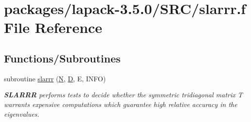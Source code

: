 \hypertarget{slarrr_8f}{}\section{packages/lapack-\/3.5.0/\+S\+R\+C/slarrr.f File Reference}
\label{slarrr_8f}
\subsection*{Functions/\+Subroutines}
\begin{DoxyCompactItemize}
\item 
subroutine \hyperlink{group__auxOTHERauxiliary_ga37c1c1075019c75d8975e952a09516d5}{slarrr} (\hyperlink{polmisc_8c_a0240ac851181b84ac374872dc5434ee4}{N}, \hyperlink{odrpack_8h_a7dae6ea403d00f3687f24a874e67d139}{D}, E, I\+N\+F\+O)
\begin{DoxyCompactList}\small\item\em {\bfseries S\+L\+A\+R\+R\+R} performs tests to decide whether the symmetric tridiagonal matrix T warrants expensive computations which guarantee high relative accuracy in the eigenvalues. \end{DoxyCompactList}\end{DoxyCompactItemize}

